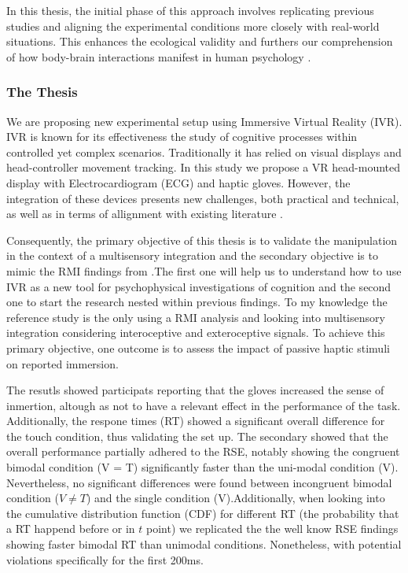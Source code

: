\documentclass[12pt,oneside,openright]{report}
\begin{document}
In this thesis, the initial phase of this approach involves replicating previous studies and aligning the experimental conditions more closely with real-world situations. This enhances the ecological validity and furthers our comprehension of how body-brain interactions manifest in human psychology \parencite{schmuckler2001ecological}. 

\subsubsection*{The Thesis}

We are proposing new experimental setup using Immersive Virtual Reality (IVR). IVR is known for its effectiveness the study of cognitive processes within controlled yet complex scenarios. Traditionally it has relied on visual displays and head-controller movement tracking. In this study we propose a VR head-mounted display with Electrocardiogram (ECG) and haptic gloves. However, the integration of these devices presents new challenges, both practical and technical, as well as in terms of allignment with existing literature \parencite{Klotzsche2023}.

Consequently, the primary objective of this thesis is to validate the manipulation in the context of a multisensory integration and the secondary objective is to mimic the RMI findings from \textcite{SALTAFOSSI2023108642}.The first one will help us to understand how to use IVR as a new tool for psychophysical investigations of cognition and the second one to start the research nested within previous findings. To my knowledge the reference study is the only using a RMI analysis and looking into multisensory integration considering interoceptive and exteroceptive signals. To achieve this primary objective, one outcome is to assess the impact of passive haptic stimuli on reported immersion. 

The resutls showed participats reporting that the gloves increased the sense of inmertion, altough as not to have a relevant effect in the performance of the task. Additionally, the respone times (RT) showed a significant overall difference for the touch condition, thus validating the set up. The secondary showed that the overall performance partially adhered to the RSE, notably showing the congruent bimodal condition (V = T) significantly faster than the uni-modal condition (V). Nevertheless, no significant differences were found between incongruent bimodal condition ($V \neq T$) and the single condition (V).Additionally, when looking into the cumulative distribution function (CDF) for different RT (the probability that a RT happend before or in $t$ point) we replicated the the well know RSE findings showing faster bimodal RT than unimodal conditions. Nonetheless, with potential violations specifically for the first 200ms.
\end{document}
